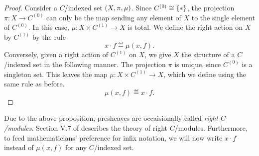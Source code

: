 \documentclass{../thesis-note}
\begin{document}
\begin{proof}
  Consider a \(C\)\-/indexed set \({\left(X,\pi,\mu\right)}\). Since \(C^{(0)} \cong
  {\left\{\ast\right\}}\), the projection \(\pi : X \to C^{(0)}\) can only be the map
  sending any element of \(X\) to the single element of \(C^{(0)}\). In this
  case, \(\mu : X \times C^{(1)} \to X\) is total. We define the right action on
  \(X\) by \(C^{(1)}\) by the rule
  \[%
    x \cdot f \eqdef \mu(x,f).
  \]%
  Conversely, given a right action of \(C^{(1)}\) on \(X\), we give \(X\) the
  structure of a \(C\)\-/indexed set in the following manner. The projection
  \(\pi\) is unique, since \(C^{(0)}\) is a singleton set. This leaves the map
  \(\mu : X \times C^{(1)} \to X\), which we define using the same rule as
  before.
  \[%
    \mu(x,f) \eqdef x \cdot f.
  \]%
\end{proof}
Due to the above proposition, presheaves are occaisionally called \emph{right
  \(C\)\-/modules}. Section V.7 of \cite{MacLane1994} describes the theory
of right \(C\)\-/modules. Furthermore, to feed mathematicians' preference for
infix notation, we will now write \(x \cdot f\) instead of \(\mu(x,f)\) for any
\(C\)\-/indexed set.
\end{document}
